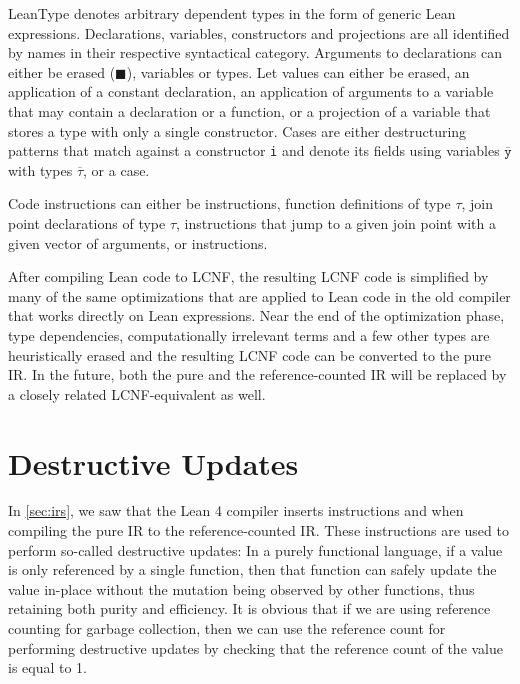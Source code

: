 LeanType denotes arbitrary dependent types in the form of generic Lean expressions. Declarations, variables, constructors and projections are all identified by names in their respective syntactical category. Arguments to declarations can either be erased ($\blacksquare$), variables or types. Let values can either be erased, an application of a constant declaration, an application of arguments to a variable that may contain a declaration or a function, or a projection of a variable that stores a type with only a single constructor. Cases are either destructuring patterns that match against a constructor \texttt{i} and denote its fields using variables $\overline{\texttt{y}}$ with types $\overline{\tau}$, or a  case.

Code instructions can either be  instructions, function definitions  of type $\tau$, join point declarations  of type $\tau$,  instructions that jump to a given join point with a given vector of arguments,  or  instructions.

After compiling Lean code to LCNF, the resulting LCNF code is simplified by many of the same optimizations that are applied to Lean code in the old compiler that works directly on Lean expressions. Near the end of the optimization phase, type dependencies, computationally irrelevant terms and a few other types are heuristically erased and the resulting LCNF code can be converted to the pure IR. In the future, both the pure and the reference-counted IR will be replaced by a closely related LCNF-equivalent as well. 

\section{Destructive Updates}\label{sec:beans}
In \cref{sec:irs}, we saw that the Lean 4 compiler inserts instructions  and  when compiling the pure IR to the reference-counted IR. These instructions are used to perform so-called destructive updates: In a purely functional language, if a value is only referenced by a single function, then that function can safely update the value in-place without the mutation being observed by other functions, thus retaining both purity and efficiency. It is obvious that if we are using reference counting for garbage collection, then we can use the reference count for performing destructive updates by checking that the reference count of the value is equal to 1.


